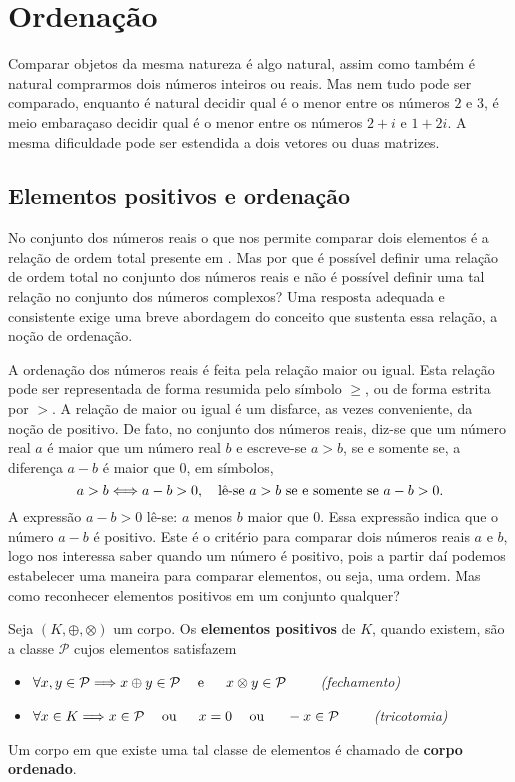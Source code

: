 \documentclass[glenn,refnum,codigo]{Estilo}
\begin{document}
\chapter{Ordenação}

Comparar objetos da mesma natureza é algo natural, assim como também é natural
comprarmos dois números inteiros ou reais. Mas nem tudo pode ser comparado, enquanto
é natural decidir qual é o menor entre os números $2$ e $3$, é meio embaraçaso decidir
qual é o menor entre os números $2+i$ e $1+2i$. A mesma dificuldade pode ser estendida
a dois vetores ou duas matrizes.

\section{Elementos positivos e ordenação}

No conjunto dos números reais o que nos permite comparar dois elementos é a
relação de ordem total presente em \R. Mas por que é possível definir uma
relação de ordem total no conjunto dos números reais e não é possível definir
uma tal relação no conjunto dos números complexos? Uma resposta adequada e
consistente exige uma breve abordagem do conceito que sustenta essa relação, a
noção de
ordenação.

A ordenação dos números reais é feita pela relação maior ou igual. Esta relação
pode ser
representada de forma resumida pelo símbolo $\geqslant$, ou de forma estrita por
$>$.
A relação de maior ou igual é um disfarce, as vezes conveniente, da noção de
positivo. De fato,
no conjunto dos números reais, diz-se que um número real $a$ é maior que um
número real $b$ e
escreve-se $a>b$, se e somente se, a diferença $a-b$ é maior que $0$, em
símbolos,
\[
a>b \Longleftrightarrow a-b>0,\quad \hbox{lê-se $a>b$ se e somente se $a-b>0$.}
\]
A expressão $a-b>0$ lê-se: $a$ menos $b$ maior que $0$. Essa expressão indica
que o número $a-b$ é
positivo. Este é o critério para comparar dois números reais $a$ e $b$, logo nos
interessa saber quando
um número é positivo, pois a partir daí podemos estabelecer uma maneira para
comparar elementos, ou
seja, uma ordem. Mas como reconhecer elementos positivos em um conjunto
qualquer?
\begin{define}
	Seja $(K,\oplus,\otimes)$ um corpo. Os \textbf{elementos positivos} de $K$,
	quando existem, são a classe $\mathcal{P}$
	cujos elementos satisfazem
	\begin{itemize}\label{positivos}
		\item  $\forall x,y\in \mathcal{P}  \Longrightarrow  x\oplus y \in \mathcal{P}
		\hspace{1.25em}\hbox{e}\hspace{1.25em}\ x\otimes y \in \mathcal{P}\qquad$  {\itshape (fechamento)}
		\item $\forall x\in K \Longrightarrow  x\in \mathcal{P} \hspace{1.25em}\hbox{ou}\hspace{1.25em}\ x=0 \hspace{1.25em}\hbox{ou}\hspace{1.25em}\
		-x\in \mathcal{P}\qquad$ {\itshape (tricotomia)}
	\end{itemize}
	Um corpo em que existe uma tal classe de elementos é chamado de \textbf{corpo
		ordenado}.
\end{define}
\end{document}
